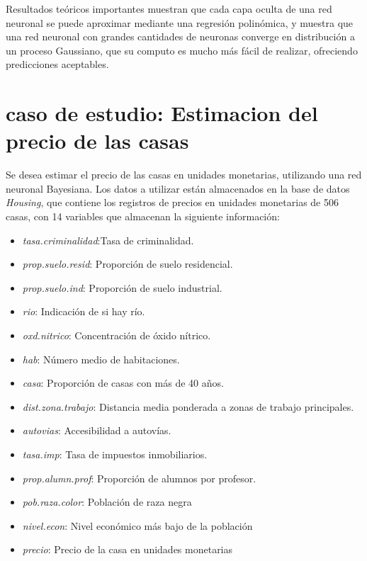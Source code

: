 \documentclass[nojss]{jss}
\begin{document}
Resultados teóricos importantes \cite{Cheng2018} muestran que cada capa oculta de una red neuronal se puede aproximar mediante una regresión polinómica, y \cite{Williams1996} muestra que una red neuronal con grandes cantidades de neuronas converge en distribución a un proceso Gaussiano, que su computo es mucho más fácil de realizar, ofreciendo predicciones aceptables.
  
\section{caso de estudio: Estimacion del precio de las casas}  

Se desea estimar el precio de las casas en unidades monetarias, utilizando una red neuronal Bayesiana. Los datos a utilizar están almacenados en la base de datos \textit{Housing}, que contiene los registros de precios en unidades monetarias de 506 casas, con 14 variables que almacenan la siguiente información:

\begin{itemize}
	\item \textit{tasa.criminalidad}:Tasa de criminalidad.
	\item \textit{prop.suelo.resid}: Proporción de suelo residencial.
	\item \textit{prop.suelo.ind}: Proporción de suelo industrial.	
	\item \textit{rio}: Indicación de si hay río.
	\item \textit{oxd.nitrico}: Concentración de óxido nítrico.
	\item \textit{hab}: Número medio de habitaciones.
	\item \textit{casa}: Proporción de casas con más de 40 años.
	\item \textit{dist.zona.trabajo}: Distancia media ponderada a zonas de trabajo principales.
	\item \textit{autovias}: Accesibilidad a autovías. 
	\item \textit{tasa.imp}: Tasa de impuestos inmobiliarios.
	\item \textit{prop.alumn.prof}: Proporción de alumnos por profesor.
	\item \textit{pob.raza.color}: Población de raza negra
	\item \textit{nivel.econ}: Nivel económico más bajo de la población
	\item \textit{precio}: Precio de la casa en unidades monetarias
\end{itemize}
\end{document}
